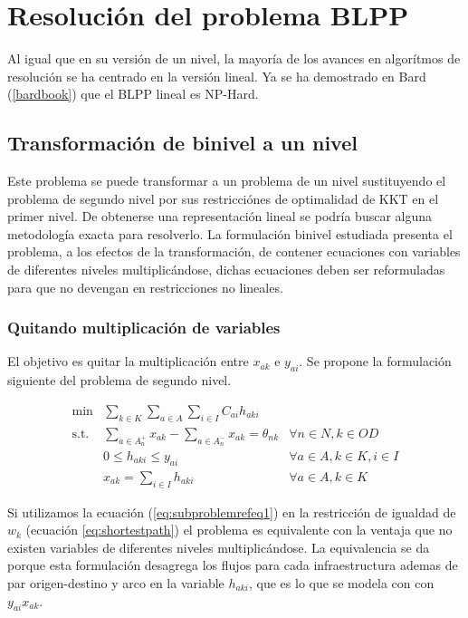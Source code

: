 \documentclass{article}
\begin{document}
  \section*{Resolución del problema BLPP}

  Al igual que en su versión de un nivel, la mayoría de los avances en algorítmos de resolución se ha centrado en la versión lineal. Ya se ha demostrado en Bard (\ref{bardbook}) que el BLPP lineal es NP-Hard.

  \subsection*{Transformación de binivel a un nivel}

  Este problema se puede transformar a un problema de un nivel sustituyendo el problema de segundo nivel por sus restricciónes de optimalidad de KKT en el primer nivel. De obtenerse una representación lineal se podría buscar alguna metodología exacta para resolverlo. La formulación binivel estudiada presenta el problema, a los efectos de la transformación, de contener ecuaciones con variables de diferentes niveles multiplicándose, dichas ecuaciones deben ser reformuladas para que no devengan en restricciones no lineales.

  \subsubsection*{Quitando multiplicación de variables}

  El objetivo es quitar la multiplicación entre $x_{ak}$ e $y_{ai}$. Se propone la formulación siguiente del problema de segundo nivel.

  \begin{align}
    \text{min}  & \sum_{k \in K} \sum_{a \in A} \sum_{i \in I} C_{ai} h_{aki}         & \label{eq:subproblemrefeq1} \\
    \text{s.t.} & \sum_{a \in A_n^+} x_{ak} - \sum_{a \in A_n^-} x_{ak} = \theta_{nk} & \forall n \in N, k \in OD \\
                & 0 \leq h_{aki} \leq y_{ai}                                          & \forall a \in A, k \in K, i \in I \\
                & x_{ak} = \sum_{i \in I} h_{aki}                                     & \forall a \in A, k \in K
  \end{align}

  Si utilizamos la ecuación (\ref{eq:subproblemrefeq1}) en la restricción de igualdad de $w_k$ (ecuación \ref{eq:shortestpath}) el problema es equivalente con la ventaja que no existen variables de diferentes niveles multiplicándose. La equivalencia se da porque esta formulación desagrega los flujos para cada infraestructura ademas de par origen-destino y arco en la variable $h_{aki}$, que es lo que se modela con con $y_{ai} x_{ak}$.
\end{document}
